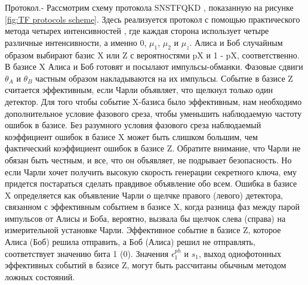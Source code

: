 Протокол.- Рассмотрим схему протокола SNSTFQKD \cite{ma2007}, показанную на рисунке \ref{fig:TF protocols scheme}. Здесь реализуется протокол с помощью практического метода четырех интенсивностей \cite{gobby2004}, где каждая сторона использует четыре различные интенсивности, а именно 0, $\mu_1$, $\mu_2$ и $\mu_z$. Алиса и Боб случайным образом выбирают базис X или Z с вероятностями pX и 1 - pX, соответственно. В базисе X Алиса и Боб готовят и посылают импульсы-обманки. Фазовые сдвиги $\theta_A$ и $\theta_B$ частным образом накладываются на их импульсы. Событие в базисе Z считается эффективным, если Чарли объявляет, что щелкнул только один детектор. Для того чтобы событие X-базиса было эффективным, нам необходимо дополнительное условие фазового среза, чтобы уменьшить наблюдаемую частоту ошибок в базисе. Без разумного условия фазового среза наблюдаемый коэффициент ошибок в базисе X может быть слишком большим, чем фактический коэффициент ошибок в базисе Z. Обратите внимание, что Чарли не обязан быть честным, и все, что он объявляет, не подрывает безопасность. Но если Чарли хочет получить высокую скорость генерации секретного ключа, ему придется постараться сделать правдивое объявление обо всем. Ошибка в базисе X определяется как объявление Чарли о щелчке правого (левого) детектора, связанном с эффективным событием в базисе X, когда разница фаз между парой импульсов от Алисы и Боба, вероятно, вызвала бы щелчок слева (справа) на измерительной установке Чарли. Эффективное событие в базисе Z, которое Алиса (Боб) решила отправить, а Боб (Алиса) решил не отправлять, соответствует значению бита 1 (0). Значения $\epsilon_1^{ph}$ и $s_1$, выход однофотонных эффективных событий в базисе Z, могут быть рассчитаны обычным методом ложных состояний.
